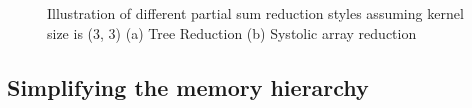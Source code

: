 \begin{figure}
    \centering
    \caption{Illustration of different partial sum reduction styles assuming kernel size is (3, 3) (a) Tree Reduction (b) Systolic array reduction}
    \label{fig:reduction_styles}
\end{figure}

\subsection{Simplifying the memory hierarchy}
\label{chap:dda:hw_dse:simplifying_hierarchy}

